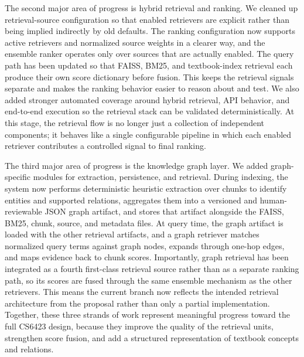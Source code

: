 \documentclass[11pt]{article}
\begin{document}
The second major area of progress is hybrid retrieval and ranking. We cleaned up retrieval-source configuration so that enabled retrievers are explicit rather than being implied indirectly by old defaults. The ranking configuration now supports active retrievers and normalized source weights in a clearer way, and the ensemble ranker operates only over sources that are actually enabled. The query path has been updated so that FAISS, BM25, and textbook-index retrieval each produce their own score dictionary before fusion. This keeps the retrieval signals separate and makes the ranking behavior easier to reason about and test. We also added stronger automated coverage around hybrid retrieval, API behavior, and end-to-end execution so the retrieval stack can be validated deterministically. At this stage, the retrieval flow is no longer just a collection of independent components; it behaves like a single configurable pipeline in which each enabled retriever contributes a controlled signal to final ranking.

The third major area of progress is the knowledge graph layer. We added graph-specific modules for extraction, persistence, and retrieval. During indexing, the system now performs deterministic heuristic extraction over chunks to identify entities and supported relations, aggregates them into a versioned and human-reviewable JSON graph artifact, and stores that artifact alongside the FAISS, BM25, chunk, source, and metadata files. At query time, the graph artifact is loaded with the other retrieval artifacts, and a graph retriever matches normalized query terms against graph nodes, expands through one-hop edges, and maps evidence back to chunk scores. Importantly, graph retrieval has been integrated as a fourth first-class retrieval source rather than as a separate ranking path, so its scores are fused through the same ensemble mechanism as the other retrievers. This means the current branch now reflects the intended retrieval architecture from the proposal rather than only a partial implementation. Together, these three strands of work represent meaningful progress toward the full CS6423 design, because they improve the quality of the retrieval units, strengthen score fusion, and add a structured representation of textbook concepts and relations.
\end{document}
